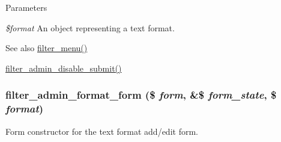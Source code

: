 \begin{DoxyParams}{Parameters}
\item[{\em \$format}]An object representing a text format.\end{DoxyParams}
\begin{DoxySeeAlso}{See also}
\hyperlink{filter_8module_a13c5612763d7d98499832594ac3d5466}{filter\_\-menu()} 

\hyperlink{filter_8admin_8inc_a86acc152c70cd47fd4425333355fb36b}{filter\_\-admin\_\-disable\_\-submit()} 
\end{DoxySeeAlso}
\hypertarget{group__forms_ga8f289105b56a610a4aac171301a2371b}{
\subsubsection[{filter\_\-admin\_\-format\_\-form}]{\setlength{\rightskip}{0pt plus 5cm}filter\_\-admin\_\-format\_\-form (\$ {\em form}, \/  \&\$ {\em form\_\-state}, \/  \$ {\em format})}}
\label{group__forms_ga8f289105b56a610a4aac171301a2371b}
Form constructor for the text format add/edit form.


